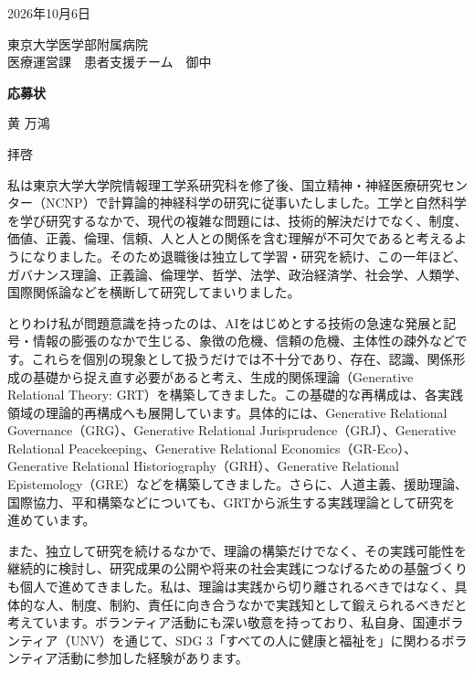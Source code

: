 \documentclass[a4paper,11pt]{article}
\newcommand{\letterdate}{2026年10月6日}
\begin{document}
\fontsize{10pt}{18.6pt}\selectfont
\noindent\hfill\letterdate\par
\noindent
東京大学医学部附属病院\\
医療運営課　患者支援チーム　御中

\vspace{-2pt}
\begin{center}
{\bfseries\fontsize{14.5pt}{17.5pt}\selectfont 応募状}
\end{center}
\vspace{-3pt}
\noindent\hfill 黄 万鴻\par
\vspace{0pt}

\noindent 拝啓

私は東京大学大学院情報理工学系研究科を修了後、国立精神・神経医療研究センター（NCNP）で計算論的神経科学の研究に従事いたしました。工学と自然科学を学び研究するなかで、現代の複雑な問題には、技術的解決だけでなく、制度、価値、正義、倫理、信頼、人と人との関係を含む理解が不可欠であると考えるようになりました。そのため退職後は独立して学習・研究を続け、この一年ほど、ガバナンス理論、正義論、倫理学、哲学、法学、政治経済学、社会学、人類学、国際関係論などを横断して研究してまいりました。

とりわけ私が問題意識を持ったのは、AIをはじめとする技術の急速な発展と記号・情報の膨張のなかで生じる、象徴の危機、信頼の危機、主体性の疎外などです。これらを個別の現象として扱うだけでは不十分であり、存在、認識、関係形成の基礎から捉え直す必要があると考え、生成的関係理論（Generative Relational Theory: GRT）を構築してきました。この基礎的な再構成は、各実践領域の理論的再構成へも展開しています。具体的には、Generative Relational Governance（GRG）、Generative Relational Jurisprudence（GRJ）、Generative Relational Peacekeeping、Generative Relational Economics（GR-Eco）、Generative Relational Historiography（GRH）、Generative Relational Epistemology（GRE）などを構築してきました。さらに、人道主義、援助理論、国際協力、平和構築などについても、GRTから派生する実践理論として研究を進めています。

また、独立して研究を続けるなかで、理論の構築だけでなく、その実践可能性を継続的に検討し、研究成果の公開や将来の社会実践につなげるための基盤づくりも個人で進めてきました。私は、理論は実践から切り離されるべきではなく、具体的な人、制度、制約、責任に向き合うなかで実践知として鍛えられるべきだと考えています。ボランティア活動にも深い敬意を持っており、私自身、国連ボランティア（UNV）を通じて、SDG 3「すべての人に健康と福祉を」に関わるボランティア活動に参加した経験があります。
\end{document}
